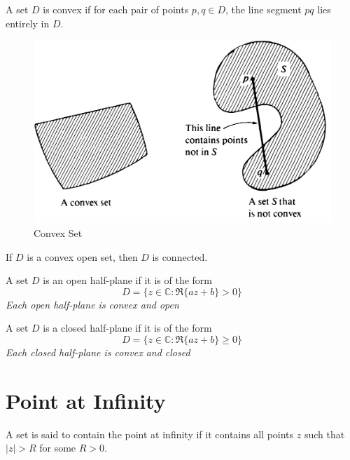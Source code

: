 \begin{definition}
    A set $D$ is convex if for each pair of points $p, q \in D$, the line segment $pq$ lies entirely in $D$.
\end{definition}

\begin{figure}[H]
    \centering
    \includegraphics[scale=0.5]{LECTURE_2/convex.png}
    \caption{Convex Set}
    \label{fig:convex}
\end{figure}

\begin{theorem}
    If $D$ is a convex open set, then $D$ is connected.
\end{theorem}

\begin{definition}
    A set $D$ is an open half-plane if it is of the form
    \[
        D = \{z \in \mathbb{C} : \Re\{az + b\} > 0\}
    \]
    \textit{Each open half-plane is convex and open}
\end{definition}

\begin{definition}
    A set $D$ is a closed half-plane if it is of the form
    \[
        D = \{z \in \mathbb{C} : \Re\{az + b\} \geq 0\}
    \]
    \textit{Each closed half-plane is convex and closed}
\end{definition}

\section{Point at Infinity}
\begin{definition}
    A set is said to contain the point at infinity if it contains all points $z$ such that $|z| > R$ for some $R > 0$.
\end{definition}

